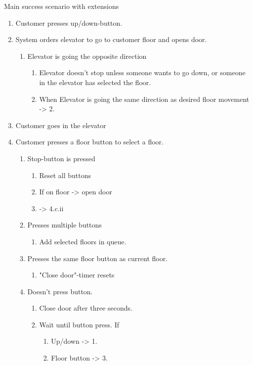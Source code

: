 \documentclass[a4paper, norsk]{article}
\begin{document}
Main success scenario with extensions
\begin{enumerate}
	\item Customer presses up/down-button.
	\item System orders elevator to go to customer floor and opens door.
	\begin{enumerate}
	\item Elevator is going the opposite direction
		\begin{enumerate}
	\item Elevator doesn't stop unless someone wants to go down, or someone in the elevator has selected the floor.
	\item When Elevator is going the same direction as desired floor movement ->  2.
			\end{enumerate}
						\end{enumerate}
	\item Customer goes in the elevator
	\item Customer presses a floor button to select a floor.
	\begin{enumerate}
	\item Stop-button is pressed
		\begin{enumerate}
	\item Reset all buttons
	\item  If on floor -> open door
	\item   -> 4.c.ii
			\end{enumerate}
	\item  Presses multiple buttons
		\begin{enumerate}
	\item  Add selected floors in queue.
			\end{enumerate}
	\item  Presses the same floor button as current floor.
		\begin{enumerate}
	\item  "Close door"-timer resets
			\end{enumerate}
	\item  Doesn't press button.
		\begin{enumerate}
	\item  Close door after three seconds.
	\item  Wait until button press. If
			\begin{enumerate}
	\item  Up/down -> 1.
	\item  Floor button -> 3.
				\end{enumerate}

\end{enumerate}
\end{enumerate}
\end{enumerate}
\end{document}
